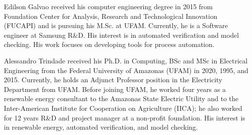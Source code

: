 \documentclass[journal]{IEEEtran}
\begin{document}
% 

\begin{IEEEbiography}
    {Edilson Galvao} received his computer engineering degree in 2015 from Foundation Center for Analysis, Research and Technological Innovation (FUCAPI) and is pursuing his M.Sc. at UFAM. Currently, he is a Software engineer at Samsung R\&D. His interest is in automated verification and model checking. His work focuses on developing tools for process automation.
\end{IEEEbiography}

\begin{IEEEbiography}
    {Alessandro Trindade}
received his Ph.D. in Computing, BSc and MSc in Electrical Engineering from the Federal University of Amazonas (UFAM) in 2020, 1995, and 2015. Currently, he holds an Adjunct Professor position in the Electricity Department from UFAM. Before joining UFAM, he worked four years as a renewable energy consultant to the Amazonas State Electric Utility and to the Inter-American Institute for Cooperation on Agriculture (IICA); he also worked for 12 years R\&D and project manager at a non-profit foundation. His interest is in renewable energy, automated verification, and model checking.
\end{IEEEbiography}
\end{document}
